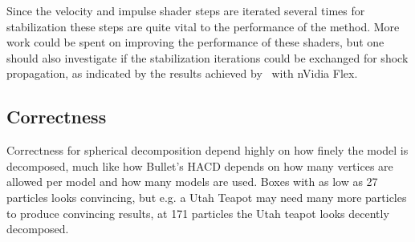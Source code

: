 Since the velocity and impulse shader steps are iterated
several times for stabilization these steps are quite vital to the performance
of the method. More work could be spent on improving the performance of these shaders,
but one should also investigate if the stabilization iterations could be exchanged for
shock propagation, as indicated by the results achieved by~\cite{flex} with nVidia Flex.

\subsection{Correctness}
Correctness for spherical decomposition depend highly on how finely the model is
decomposed, much like how Bullet's HACD depends on how many vertices are allowed
per model and how many models are used. Boxes with as low as 27 particles looks convincing, but e.g. a Utah Teapot
may need many more particles to produce convincing results, at 171 particles the
Utah teapot looks decently decomposed.
